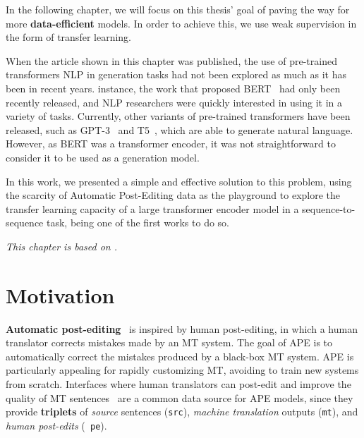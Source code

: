 \label{chap:ape}

\cleardoublepage
{}

In the following chapter, we will focus on this thesis' goal of
paving the way for more \textbf{data-efficient} models. In order to
achieve this, we use weak supervision in the form of transfer learning.

When the article shown in this chapter was published, the use of
pre-trained transformers %
NLP in generation tasks had not been explored as much as it has been
in recent years.
instance, the work that proposed BERT~\citep{devlin2018bert} had only
been recently released, and NLP researchers were quickly interested in
using it in a variety of tasks. Currently, other variants of
pre-trained transformers have been released, such as
GPT-3~\citep{brown2020language} and
T5~\citep{raffel2020Exploringlimitstransfer}, which are able to
generate natural language. However, as BERT was a transformer
encoder, it was not straightforward to consider it to be used as a
generation model.

In this work, we presented a simple and effective
solution to this problem, using the scarcity of Automatic Post-Editing
data as the playground to explore the transfer learning capacity of a
large transformer encoder model in a sequence-to-sequence task,
being one of the first works to do so.

\emph{This chapter is based on \citet{Correia2019}.}

\section{Motivation}

 {\bf Automatic post-editing}~\citep[APE;][]{simard2007rule} is
inspired by human post-editing, in which a human translator corrects
mistakes made by an MT system.
The goal of APE is to automatically correct the mistakes produced by
a black-box MT system. APE is particularly
appealing for rapidly customizing MT, avoiding to train new systems
from scratch. Interfaces where human translators can post-edit and
improve the quality of MT
sentences~\citep{Alabau2014,Federico2014,Denkowski2015,Hokamp2018}
are a common data source for APE models, since they provide {\bf
        triplets} of {\it source} sentences ({\tt src}), {\it machine
        translation} outputs ({\tt mt}), and {\it human post-edits} ({\tt
        pe}).

